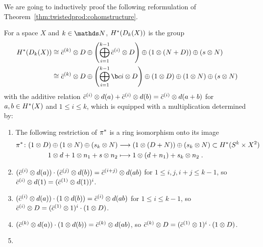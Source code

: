 We are going to inductively proof the following reformulation of
Theorem~\ref{thm:twistedprod:cohomstructure}.
\begin{Thm}\label{thm:twistedprod:cohomstructure:alt}
  For a space $X$ and $k\in\Nat$, $H^*(D_{k}({X}))$ is the group
  \begin{align*}
    \H^*(\Twistedprod{k}{X})
    &\cong
      \bc k\otimes D
      \oplus \left(\bigoplus_{i=1}^{k-1} \bc i\otimes D\right)
      \oplus (1\otimes(N+D))
      \oplus (s\otimes N)
    \\
    &\cong
      \bar c^{(k)}\otimes D
      \oplus \left(\bigoplus_{i=1}^{k-1} \b c i\otimes D\right)
      \oplus (1\otimes D)
      \oplus (1\otimes N)
      \oplus (s\otimes N)
  \end{align*}
  with the additive relation
  $\bar c^{(i)}\otimes d(a) + \bar c^{(i)}\otimes d(b)=\bar c^{(i)}\otimes d(a+b)$ for
  $a,b\in H^*(X)$ and $1\leq i\leq k$,
  which is equipped with a multiplication determined by:
  \begin{enumerate}
  \item\label{twistedprodcohom:proof:0}
    The following restriction of ${\pi}^*$ is a ring isomorphism onto
    its image
    \begin{align*}
      {\pi}^*\colon
      (1\otimes D)\oplus (1\otimes N)\oplus(s_k \otimes N)
      &\longrightarrow
        (1\otimes(D+N))\oplus(s_k\otimes N)
        \subset H^*(S^{k}\times X^2)
      \\
      1\otimes d + 1\otimes n_1 + s\otimes n_2
      &\longmapsto
        1\otimes(d+n_1) + s_k\otimes n_2
        \;.
    \end{align*}
  \item\label{twistedprodcohom:proof:1}
    $(\bar c^{(i)}\otimes d(a))\cdot (\bar c^{(j)}\otimes d(b))
    = \bar c^{(i+j)}\otimes d(ab)$ for $1\leq i,j,i+j\leq k-1$,
    so $\bar c^{(i)}\otimes d(1) = (\bar c^{(1)}\otimes d(1))^i$.
  \item\label{twistedprodcohom:proof:2}
    $(\bar c^{(i)}\otimes d(a))\cdot(1\otimes d(b))
    = \bar c^{(i)}\otimes d(ab)$ for $1\leq i\leq k-1$,
    so $\bar c^{(i)}\otimes D = (\bar c^{(1)}\otimes 1)^i\cdot (1\otimes D)$.
  \item\label{twistedprodcohom:proof:3}
    $(\bar c^{(k)}\otimes d(a))\cdot(1\otimes d(b))
    = \bar c^{(k)}\otimes d(ab)$,
    so $\bar c^{(k)}\otimes D = (\bar c^{(1)}\otimes 1)^i\cdot (1\otimes D)$.
  \item\label{twistedprodcohom:proof:4}

\end{enumerate}
\end{Thm}
